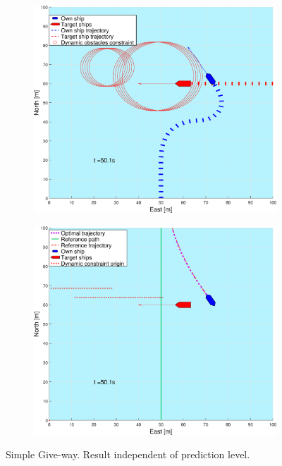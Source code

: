 \begin{figure}[ht!]
\begin{subfigure}[b]{0.499\textwidth}
        \subcaption{}
    \end{subfigure}
    \hfill
    \\
    \begin{subfigure}[b]{0.49\textwidth}
        \centering
        \includegraphics[width=\textwidth]{Images/Figures/enkel_GW/_Simple_0fig1_time=50}
        \subcaption{}
    \end{subfigure}
    \hfill
    \begin{subfigure}[b]{0.499\textwidth}
        \centering
        \includegraphics[width=\textwidth]{Images/Figures/enkel_GW/_Simple_0fig999_time=50}
        \subcaption{}
    \end{subfigure}
    \hfill
    \caption{Simple Give-way. Result independent of prediction level.}
    \label{FIG: simple GW}
\end{figure}%

